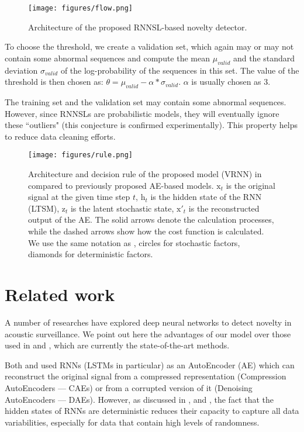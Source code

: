 \documentclass{article}
\begin{document}
\begin{figure}
  \centering
  \texttt{[image: figures/flow.png]}\caption{Architecture of the proposed RNNSL-based novelty detector.} \label{figArchitecture}
\end{figure}

To choose the threshold, we create a validation set, which again may or may not contain some abnormal sequences and compute the mean $\mu_{valid}$ and the standard deviation $\sigma_{valid}$ of the log-probability of the sequences in this set. The value of the threshold is then chosen as: $\theta = \mu_{valid} - \alpha*\sigma_{valid}$.
$\alpha$ is usually chosen as $3$.  

The training set and the validation set may contain some abnormal sequences. However, since RNNSLs are probabilistic models, they will eventually ignore these ``outliers" (this conjecture is confirmed experimentally). This property helps to reduce data cleaning efforts.


\begin{figure}
  \centering
  \texttt{[image: figures/rule.png]}\caption{Architecture and decision rule of the proposed model (VRNN) in compared to previously proposed AE-based models. $\boldsymbol{\mathrm{x}}_t$ is the original signal at the given time step $t$, $\boldsymbol{\mathrm{h}}_t$ is the hidden state of the RNN (LTSM), $\boldsymbol{\mathrm{z}}_t$ is the latent stochastic state, $\boldsymbol{\mathrm{x}}'_t$ is the reconstructed output of the AE. The solid arrows denote the calculation processes, while the dashed arrows show how the cost function is calculated. We use the same notation as \cite{fraccaro_sequential_2016}, circles for stochastic factors, diamonds for deterministic factors.} \label{figRule}
  \vspace{-4mm}
\end{figure} \section{Related work}
 \label{secRelatedWork}
 
A number of researches have explored deep neural networks to detect novelty in acoustic surveillance. We point out here the advantages of our model over those used in \cite{marchi_novel_2015} and \cite{principi_acoustic_2017}, which are currently the state-of-the-art methods. 

Both \cite{marchi_novel_2015} and \cite{principi_acoustic_2017} used RNNs (LSTMs in particular) as an AutoEncoder (AE) which can reconstruct the original signal from a compressed representation (Compression AutoEncoders --- CAEs) or from a corrupted version of it (Denoising AutoEncoders --- DAEs). However, as discussed in \cite{chung_recurrent_2015}, \cite{fraccaro_sequential_2016} and \cite{krishnan_deep_2017}, the fact that the hidden states of RNNs are deterministic reduces their capacity to capture all data variabilities, especially for data that contain high levels of randomness. 
\end{document}
